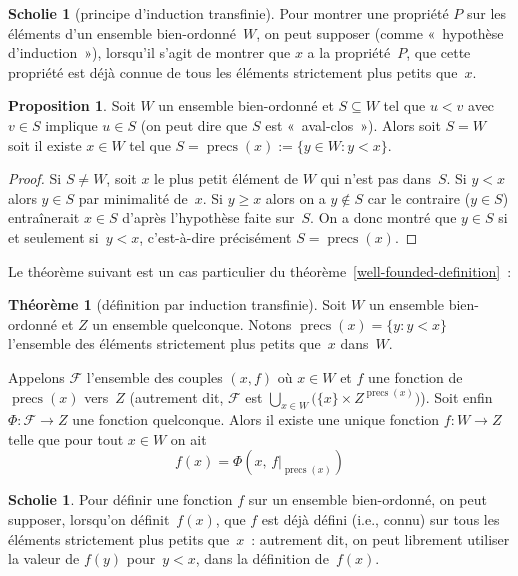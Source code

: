 \documentclass[12pt,a4paper]{article}
\theoremstyle{definition}
\newtheorem{prop}[comcnt]{Proposition}
\newtheorem{thm}[comcnt]{Théorème}
\newtheorem{scho}[comcnt]{Scholie}
\newcommand{\precs}{\operatorname{precs}}
\begin{document}
\begin{scho}[principe d'induction transfinie]\label{scholion-transfinite-induction}
Pour montrer une propriété $P$ sur les éléments d'un ensemble
bien-ordonné $W$, on peut supposer (comme « hypothèse d'induction »),
lorsqu'il s'agit de montrer que $x$ a la propriété $P$, que cette
propriété est déjà connue de tous les éléments strictement plus petits
que $x$.
\end{scho}

\begin{prop}\label{downward-closed-subsets-of-well-ordered-sets}
Soit $W$ un ensemble bien-ordonné et $S \subseteq W$ tel que $u < v$
avec $v \in S$ implique $u \in S$ (on peut dire que $S$ est
« aval-clos »).  Alors soit $S = W$ soit il existe $x\in W$ tel que $S
= \precs(x) := \{y\in W : y<x\}$.
\end{prop}
\begin{proof}
Si $S \neq W$, soit $x$ le plus petit élément de $W$ qui n'est pas
dans $S$.  Si $y < x$ alors $y \in S$ par minimalité de $x$.  Si $y
\geq x$ alors on a $y \not\in S$ car le contraire ($y \in S$)
entraînerait $x \in S$ d'après l'hypothèse faite sur $S$.  On a donc
montré que $y \in S$ si et seulement si $y < x$, c'est-à-dire
précisément $S = \precs(x)$.
\end{proof}

Le théorème suivant est un cas particulier du
théorème \ref{well-founded-definition} :

\begin{thm}[définition par induction transfinie]\label{transfinite-definition}
Soit $W$ un ensemble bien-ordonné et $Z$ un ensemble quelconque.
Notons $\precs(x) = \{y : y<x\}$ l'ensemble des éléments strictement
plus petits que $x$ dans $W$.

Appelons $\mathscr{F}$ l'ensemble des couples $(x,f)$ où $x\in W$ et
$f$ une fonction de $\precs(x)$ vers $Z$ (autrement dit, $\mathscr{F}$
est $\bigcup_{x \in W} \big(\{x\}\times Z^{\precs(x)}\big)$).  Soit
enfin $\Phi\colon \mathscr{F} \to Z$ une fonction quelconque.  Alors
il existe une unique fonction $f\colon W \to Z$ telle que pour tout $x
\in W$ on ait
\[
f(x) = \Phi(x,\, f|_{\precs(x)})
\]
\end{thm}

\begin{scho}\label{scholion-transfinite-definition}
Pour définir une fonction $f$ sur un ensemble bien-ordonné, on peut
supposer, lorsqu'on définit $f(x)$, que $f$ est déjà défini (i.e.,
connu) sur tous les éléments strictement plus petits que $x$ :
autrement dit, on peut librement utiliser la valeur de $f(y)$
pour $y<x$, dans la définition de $f(x)$.
\end{scho}
\end{document}
